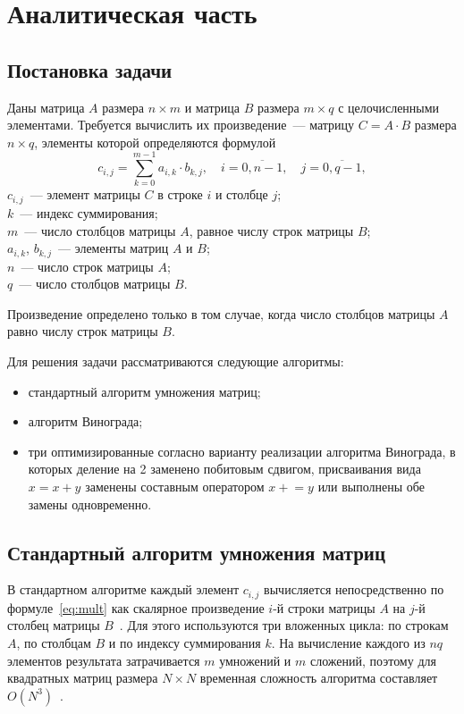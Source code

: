 \section{Аналитическая часть}

\subsection{Постановка задачи}
Даны матрица $A$ размера $n \times m$ и матрица $B$ размера $m \times q$ с целочисленными элементами. Требуется вычислить их произведение~--- матрицу $C = A \cdot B$ размера $n \times q$, элементы которой определяются формулой~\cite[с.~172]{laaksonen2024}
\begin{equation}
	\label{eq:mult}
	c_{i,j} = \sum_{k=0}^{m-1} a_{i,k} \cdot b_{k,j}, \quad i = \overline{0, n-1}, \quad j = \overline{0, q-1},
\end{equation}
\where{} $c_{i,j}$~--- элемент матрицы $C$ в строке $i$ и столбце $j$;\\
$k$~--- индекс суммирования;\\
$m$~--- число столбцов матрицы $A$, равное числу строк матрицы $B$;\\
$a_{i,k}$, $b_{k,j}$~--- элементы матриц $A$ и $B$;\\
$n$~--- число строк матрицы $A$;\\
$q$~--- число столбцов матрицы $B$.

Произведение определено только в том случае, когда число столбцов матрицы $A$ равно числу строк матрицы $B$.

Для решения задачи рассматриваются следующие алгоритмы:
\begin{itemize}
	\item стандартный алгоритм умножения матриц;
	\item алгоритм Винограда;
	\item три оптимизированные согласно варианту реализации алгоритма Винограда, в которых деление на 2 заменено побитовым сдвигом, присваивания вида $x = x + y$ заменены составным оператором $x \mathrel{+}= y$ или выполнены обе замены одновременно.
\end{itemize}

\subsection{Стандартный алгоритм умножения матриц}
В стандартном алгоритме каждый элемент $c_{i,j}$ вычисляется непосредственно по формуле~\eqref{eq:mult} как скалярное произведение $i$-й строки матрицы $A$ на $j$-й столбец матрицы $B$~\cite[с.~172--173]{laaksonen2024}. Для этого используются три вложенных цикла: по строкам $A$, по столбцам $B$ и по индексу суммирования $k$. На вычисление каждого из $n q$ элементов результата затрачивается $m$ умножений и $m$ сложений, поэтому для квадратных матриц размера $N \times N$ временная сложность алгоритма составляет $O(N^3)$~\cite[с.~173]{laaksonen2024}.

